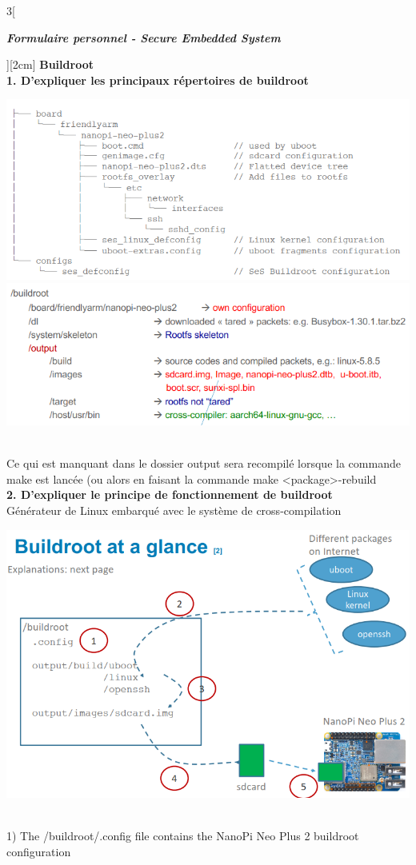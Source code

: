 \begin{multicols}{3}[\centerline{ \large\em \textbf{Formulaire personnel - Secure Embedded System}}][2cm]
{\Large \textbf{Buildroot}}\\
\textbf{1. D’expliquer les principaux répertoires de buildroot\\}
	
\begin{minipage}{\linewidth}
	\centering
    \includegraphics[width =0.6\columnwidth]{images/1.png}
    \includegraphics[width =0.6\columnwidth]{images/2.png}
\end{minipage}\\
Ce qui est manquant dans le dossier output sera recompilé lorsque la commande make est lancée (ou alors en faisant la commande make <package>-rebuild\\
\textbf{2. D’expliquer le principe de fonctionnement de buildroot\\}
Générateur de Linux embarqué avec le système de cross-compilation\\
\begin{minipage}{\linewidth}
	\centering
    \includegraphics[width =0.5\columnwidth]{images/3.png}
\end{minipage}\\
1) The /buildroot/.config file contains the NanoPi Neo Plus 2 buildroot configuration\\

\end{multicols}
